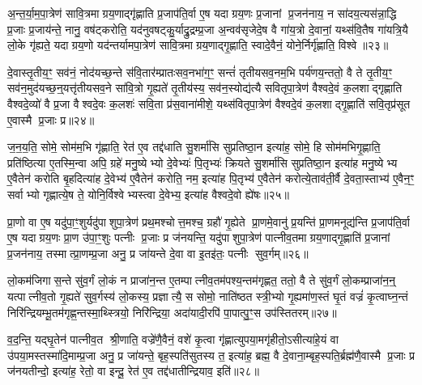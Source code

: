 {\anuvakamend[{ए॒व य॒ज्ञाज्ज॒रायु॒ तदे॒व तद॒न्तर्द॑धाति॒ न स॒प्तविꣳ॑शतिश्च॥६॥}]}

अ॒न्त॒र्या॒म॒पा॒त्रेण॑ सावि॒त्रमाग्रय॒णाद्गृ॑ह्णाति प्र॒जाप॑ति॒र्वा ए॒ष यदाग्रय॒णः प्र॒जानां प्र॒जन॑नाय॒ न सा॑दय॒त्यस॑न्ना॒द्धि प्र॒जाः प्र॒जाय॑न्ते॒ नानु॒ वष॑ट्करोति॒ यद॑नुवषट्कु॒र्याद्रु॒द्रम्प्र॒जा अ॒न्वव॑सृजेदे॒ष वै गा॑य॒त्रो दे॒वानां॒ यथ्स॑वि॒तैष गा॑यत्रि॒यै लो॒के गृ॑ह्यते॒ यदाग्रय॒णो यद॑न्तर्यामपा॒त्रेण॑ सावि॒त्रमाग्रय॒णाद्गृ॒ह्णाति॒ स्वादे॒वैनं॒ योने॒र्निर्गृ॑ह्णाति॒ विश्वे॥२३॥

दे॒वास्तृ॒तीय॒ꣳ॒ सव॑नं॒ नोद॑यच्छ॒न्ते स॑वि॒तार॑म्प्रातःसव॒नभा॑ग॒ꣳ॒ सन्तं॑ तृतीयसव॒नम॒भि पर्य॑णय॒न्ततो॒ वै ते तृ॒तीय॒ꣳ॒ सव॑न॒मुद॑यच्छ॒न्॒यत्तृ॑तीयसव॒ने सा॑वि॒त्रो गृ॒ह्यते॑ तृ॒तीय॑स्य॒ सव॑न॒स्योद्य॑त्यै सवितृपा॒त्रेण॑ वैश्वदे॒वं क॒लशाद्गृह्णाति वैश्वदे॒व्यो॑ वै प्र॒जा वैश्वदे॒वः क॒लशः॑ सवि॒ता प्र॑स॒वाना॑मीशे॒ यथ्स॑वितृपा॒त्रेण॑ वैश्वदे॒वं क॒लशाद्गृ॒ह्णाति॑ सवि॒तृप्र॑सूत ए॒वास्मै प्र॒जाः प्र॥२४॥

ज॒न॒य॒ति॒ सोमे॒ सोम॑म॒भि गृ॑ह्णाति॒ रेत॑ ए॒व तद्द॑धाति सु॒शर्मा॑सि सुप्रतिष्ठा॒न इत्या॑ह॒ सोमे॒ हि सोम॑मभिगृ॒ह्णाति॒ प्रति॑ष्ठित्या ए॒तस्मि॒न्वा अपि॒ ग्रहे॑ मनु॒ष्येभ्यो दे॒वेभ्यः॑ पि॒तृभ्यः॑ क्रियते सु॒शर्मा॑सि सुप्रतिष्ठा॒न इत्या॑ह मनु॒ष्येभ्य ए॒वैतेन॑ करोति बृ॒हदित्या॑ह दे॒वेभ्य॑ ए॒वैतेन॑ करोति॒ नम॒ इत्या॑ह पि॒तृभ्य॑ ए॒वैतेन॑ करोत्ये॒ताव॑ती॒र्वै दे॒वता॒स्ताभ्य॑ ए॒वैन॒ꣳ॒ सर्वाभ्यो गृह्णात्ये॒ष ते॒ योनि॒र्विश्वेभ्यस्त्वा दे॒वेभ्य॒ इत्या॑ह वैश्वदे॒वो ह्ये॑षः॥२५॥

{\anuvakamend[{विश्वे॒ प्र पि॒तृभ्य॑ ए॒वैतेन॑ करो॒त्येका॒न्नविꣳ॑श॒तिश्च॑॥७॥}]}

प्रा॒णो वा ए॒ष यदु॑पा॒ꣳ॒शुर्यदु॑पाशुपा॒त्रेण॑ प्रथ॒मश्चोत्त॒मश्च॒ ग्रहौ॑ गृ॒ह्येते प्रा॒णमे॒वानु॑ प्र॒यन्ति॑ प्रा॒णमनूद्य॑न्ति प्र॒जाप॑ति॒र्वा ए॒ष यदाग्रय॒णः प्रा॒ण उ॑पा॒ꣳ॒शुः पत्नीः प्र॒जाः प्र ज॑नयन्ति॒ यदु॑पाशुपा॒त्रेण॑ पात्नीव॒तमाग्रय॒णाद्गृ॒ह्णाति॑ प्र॒जानां प्र॒जन॑नाय॒ तस्मात्प्रा॒णम्प्र॒जा अनु॒ प्र जा॑यन्ते दे॒वा वा इ॒तइ॑तः॒ पत्नीः सुव॒र्गम्॥२६॥

लो॒कम॑जिगास॒न्ते सु॑व॒र्गं लो॒कं न प्राजा॑न॒न्त ए॒तम्पात्नीव॒तम॑पश्य॒न्तम॑गृह्णत॒ ततो॒ वै ते सु॑व॒र्गं लो॒कम्प्राजा॑न॒न्॒ यत्पात्नीव॒तो गृ॒ह्यते॑ सुव॒र्गस्य॑ लो॒कस्य॒ प्रज्ञात्यै॒ स सोमो॒ नाति॑ष्ठत स्त्री॒भ्यो गृ॒ह्यमा॑ण॒स्तं घृ॒तं वज्रं॑ कृ॒त्वाघ्न॒न्तं निरि॑न्द्रियम्भू॒तम॑गृह्ण॒न्तस्मा॒थ्स्त्रियो॒ निरि॑न्द्रिया॒ अदा॑यादी॒रपि॑ पा॒पात्पु॒ꣳ॒स उप॑स्तितरम्॥२७॥

व॒द॒न्ति॒ यद्घृ॒तेन॑ पात्नीव॒त श्री॒णाति॒ वज्रे॑णै॒वैनं॒ वशे॑ कृ॒त्वा गृ॑ह्णात्युपया॒मगृ॑हीतो॒ऽसीत्या॑हे॒यं वा उ॑पया॒मस्तस्मा॑दि॒माम्प्र॒जा अनु॒ प्र जा॑यन्ते॒ बृह॒स्पति॑सुतस्य त॒ इत्या॑ह॒ ब्रह्म॒ वै दे॒वाना॒म्बृह॒स्पति॒र्ब्रह्म॑णै॒वास्मै प्र॒जाः प्र ज॑नयतीन्दो॒ इत्या॑ह॒ रेतो॒ वा इन्दू॒ रेत॑ ए॒व तद्द॑धातीन्द्रियाव॒ इति॑॥२८॥

